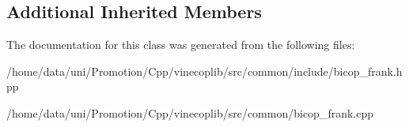 \subsection*{Additional Inherited Members}


The documentation for this class was generated from the following files\+:\begin{DoxyCompactItemize}
\item 
/home/data/uni/\+Promotion/\+Cpp/vinecoplib/src/common/include/bicop\+\_\+frank.\+hpp\item 
/home/data/uni/\+Promotion/\+Cpp/vinecoplib/src/common/bicop\+\_\+frank.\+cpp\end{DoxyCompactItemize}
